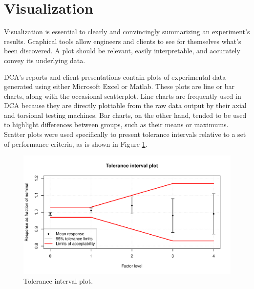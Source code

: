 \documentclass[11pt,a4paper,article]{memoir} %
\begin{document}
\newpage
\section{Visualization}
Visualization is essential to clearly and convincingly summarizing an experiment's results. Graphical tools allow engineers and clients to see for themselves what's been discovered. A plot should be relevant, easily interpretable, and accurately convey its underlying data.
\par
DCA's reports and client presentations contain plots of experimental data generated using either Microsoft Excel or Matlab. These plots are line or bar charts, along with the occasional scatterplot. Line charts are frequently used in DCA because they are directly plottable from the raw data output by their axial and torsional testing machines. Bar charts, on the other hand, tended to be used to highlight differences between groups, such as their means or maximums. Scatter plots were used specifically to present tolerance intervals relative to a set of performance criteria, as is shown in Figure \ref{fig:tolerance_intervals_plot}.
\begin{figure}[h!]
	\includegraphics[width=\textwidth]{tolerance_intervals_plot.pdf}
	\caption{Tolerance interval plot.}
	\label{fig:tolerance_intervals_plot}
\end{figure}
\end{document}
